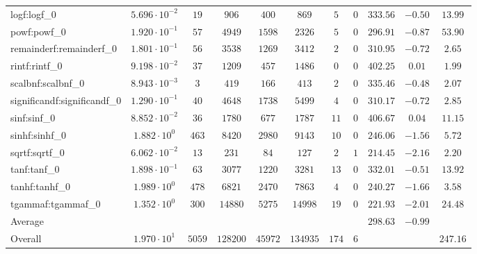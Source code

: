 \begin{tabular}{|l|c|c|c|c|c|c|c|c|c|c|}
logf:logf\_0                 & $ 5.696 \cdot 10^{-2} $ & $ 19     $ & $ 906    $ & $ 400   $ & $ 869    $ & $ 5   $ & $ 0 $ & $ 333.56      $ & $ -0.50   $ & $ 13.99   $ \\
powf:powf\_0                 & $ 1.920 \cdot 10^{-1} $ & $ 57     $ & $ 4949   $ & $ 1598  $ & $ 2326   $ & $ 5   $ & $ 0 $ & $ 296.91      $ & $ -0.87   $ & $ 53.90   $ \\
remainderf:remainderf\_0     & $ 1.801 \cdot 10^{-1} $ & $ 56     $ & $ 3538   $ & $ 1269  $ & $ 3412   $ & $ 2   $ & $ 0 $ & $ 310.95      $ & $ -0.72   $ & $ 2.65    $ \\
rintf:rintf\_0               & $ 9.198 \cdot 10^{-2} $ & $ 37     $ & $ 1209   $ & $ 457   $ & $ 1486   $ & $ 0   $ & $ 0 $ & $ 402.25      $ & $ 0.01    $ & $ 1.99    $ \\
scalbnf:scalbnf\_0           & $ 8.943 \cdot 10^{-3} $ & $ 3      $ & $ 419    $ & $ 166   $ & $ 413    $ & $ 2   $ & $ 0 $ & $ 335.46      $ & $ -0.48   $ & $ 2.07    $ \\
significandf:significandf\_0 & $ 1.290 \cdot 10^{-1} $ & $ 40     $ & $ 4648   $ & $ 1738  $ & $ 5499   $ & $ 4   $ & $ 0 $ & $ 310.17      $ & $ -0.72   $ & $ 2.85    $ \\
sinf:sinf\_0                 & $ 8.852 \cdot 10^{-2} $ & $ 36     $ & $ 1780   $ & $ 677   $ & $ 1787   $ & $ 11  $ & $ 0 $ & $ 406.67      $ & $ 0.04    $ & $ 11.15   $ \\
sinhf:sinhf\_0               & $ 1.882 \cdot 10^{0}  $ & $ 463    $ & $ 8420   $ & $ 2980  $ & $ 9143   $ & $ 10  $ & $ 0 $ & $ 246.06      $ & $ -1.56   $ & $ 5.72    $ \\
sqrtf:sqrtf\_0               & $ 6.062 \cdot 10^{-2} $ & $ 13     $ & $ 231    $ & $ 84    $ & $ 127    $ & $ 2   $ & $ 1 $ & $ 214.45      $ & $ -2.16   $ & $ 2.20    $ \\
tanf:tanf\_0                 & $ 1.898 \cdot 10^{-1} $ & $ 63     $ & $ 3077   $ & $ 1220  $ & $ 3281   $ & $ 13  $ & $ 0 $ & $ 332.01      $ & $ -0.51   $ & $ 13.92   $ \\
tanhf:tanhf\_0               & $ 1.989 \cdot 10^{0}  $ & $ 478    $ & $ 6821   $ & $ 2470  $ & $ 7863   $ & $ 4   $ & $ 0 $ & $ 240.27      $ & $ -1.66   $ & $ 3.58    $ \\
tgammaf:tgammaf\_0           & $ 1.352 \cdot 10^{0}  $ & $ 300    $ & $ 14880  $ & $ 5275  $ & $ 14998  $ & $ 19  $ & $ 0 $ & $ 221.93      $ & $ -2.01   $ & $ 24.48   $ \\
\hline
Average                      & $                     $ & $        $ & $        $ & $       $ & $        $ & $     $ & $   $ & $ 298.63      $ & $ -0.99   $ & $         $ \\
\hline
Overall                      & $ 1.970 \cdot 10^{1}  $ & $ 5059   $ & $ 128200 $ & $ 45972 $ & $ 134935 $ & $ 174 $ & $ 6 $ & $             $ & $         $ & $ 247.16  $ \\
\hline
\end{tabular}
